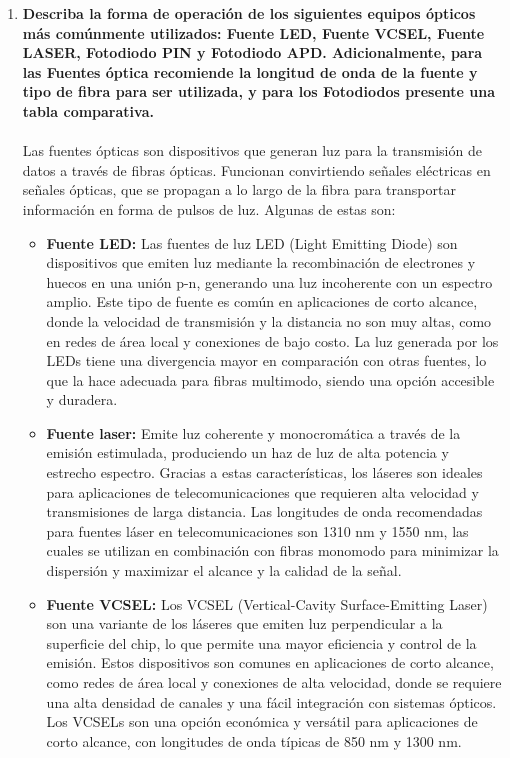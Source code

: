 \begin{enumerate}
	\item \textbf{Describa la forma de operación de los siguientes equipos ópticos más comúnmente utilizados: Fuente LED, Fuente VCSEL, Fuente LASER, Fotodiodo PIN y
	Fotodiodo APD. Adicionalmente, para las Fuentes óptica recomiende la longitud de onda de la fuente y tipo de fibra para ser utilizada, y para los Fotodiodos presente una tabla comparativa.}\\\\
	Las fuentes ópticas son dispositivos que generan luz para la transmisión de datos a través de fibras ópticas. Funcionan convirtiendo señales eléctricas en señales ópticas, que se propagan a lo largo de la fibra para transportar información en forma de pulsos de luz. Algunas de estas son:
	\begin{itemize}
		\item \textbf{Fuente LED:} Las fuentes de luz LED (Light Emitting Diode) son dispositivos que emiten luz mediante la recombinación de electrones y huecos en una unión p-n, generando una luz incoherente con un espectro amplio. Este tipo de fuente es común en aplicaciones de corto alcance, donde la velocidad de transmisión y la distancia no son muy altas, como en redes de área local y conexiones de bajo costo. La luz generada por los LEDs tiene una divergencia mayor en comparación con otras fuentes, lo que la hace adecuada para fibras multimodo, siendo una opción accesible y duradera.
		\item \textbf{Fuente laser:} Emite luz coherente y monocromática a través de la emisión estimulada, produciendo un haz de luz de alta potencia y estrecho espectro. Gracias a estas características, los láseres son ideales para aplicaciones de telecomunicaciones que requieren alta velocidad y transmisiones de larga distancia. Las longitudes de onda recomendadas para fuentes láser en telecomunicaciones son 1310 nm y 1550 nm, las cuales se utilizan en combinación con fibras monomodo para minimizar la dispersión y maximizar el alcance y la calidad de la señal.
		\item \textbf{Fuente VCSEL:} Los VCSEL (Vertical-Cavity Surface-Emitting Laser) son una variante de los láseres que emiten luz perpendicular a la superficie del chip, lo que permite una mayor eficiencia y control de la emisión. Estos dispositivos son comunes en aplicaciones de corto alcance, como redes de área local y conexiones de alta velocidad, donde se requiere una alta densidad de canales y una fácil integración con sistemas ópticos. Los VCSELs son una opción económica y versátil para aplicaciones de corto alcance, con longitudes de onda típicas de 850 nm y 1300 nm.

\end{itemize}
\end{enumerate}
